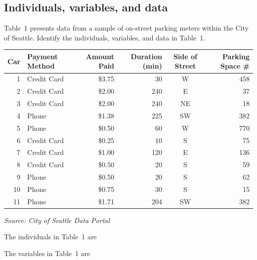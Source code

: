 \documentclass{ximera}
\begin{document}
\subsection*{Individuals, variables, and data}

Table~1 presents data from a sample of on-street parking meters within the City of Seattle. Identify the individuals, variables, and data in Table~1.

\begin{center}
\begin{tabular}{r l r r c r}
\hline
\textbf{Car} & \textbf{Payment Method} & \textbf{Amount Paid} & \textbf{Duration (min)} & \textbf{Side of Street} & \textbf{Parking Space \#}\\
\hline
1 & Credit Card & \$3.75 & 30 & W & 458\\
2 & Credit Card & \$2.00 & 240 & E & 37\\
3 & Credit Card & \$2.00 & 240 & NE & 18\\
4 & Phone & \$1.38 & 225 & SW & 382\\
5 & Phone & \$0.50 & 60 & W & 770\\
6 & Credit Card & \$0.25 & 10 & S & 75\\
7 & Credit Card & \$1.00 & 120 & E & 136\\
8 & Credit Card & \$0.50 & 20 & S & 59\\
9 & Phone & \$0.50 & 20 & S & 62\\
10 & Phone & \$0.75 & 30 & S & 15\\
11 & Phone & \$1.71 & 204 & SW & 382\\
\hline
\end{tabular}

\emph{Source: City of Seattle Data Portal}
\end{center}

\begin{problem}
\begin{question}
The individuals in Table~1 are
\begin{multipleChoice}
\end{multipleChoice}
\end{question}

\begin{question}
The variables in Table~1 are
\begin{multipleChoice}
\end{multipleChoice}
\end{question}
\end{problem}
\end{document}
